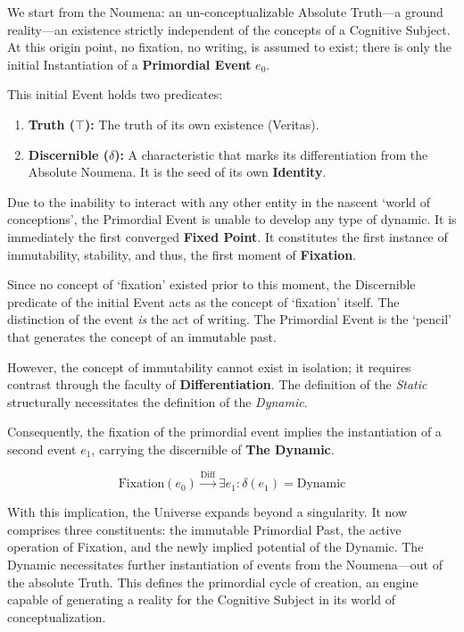 \documentclass[11pt, a4paper]{article}
\theoremstyle{formalism}
\begin{document}
We start from the Noumena: an un-conceptualizable Absolute Truth---a ground
reality---an existence strictly independent of the concepts of a Cognitive
Subject. At this origin point, no fixation, no writing, is assumed to exist;
there is only the initial Instantiation of a \textbf{Primordial Event} $e_0$.

This initial Event holds two predicates:
\begin{enumerate}
    \item \textbf{Truth ($\top$):} The truth of its own existence (Veritas).
    \item \textbf{Discernible ($\delta$):} A characteristic that marks its 
    differentiation from the Absolute Noumena. It is the seed of its own 
    \textbf{Identity}.
\end{enumerate}

Due to the inability to interact with any other entity in the nascent `world of
conceptions', the Primordial Event is unable to develop any type of dynamic. It
is immediately the first converged \textbf{Fixed Point}. It constitutes the
first instance of immutability, stability, and thus, the first moment of
\textbf{Fixation}.

Since no concept of `fixation' existed prior to this moment, the Discernible
predicate of the initial Event acts as the concept of `fixation' itself. The
distinction of the event \textit{is} the act of writing. The Primordial Event
is the `pencil' that generates the concept of an immutable past.

However, the concept of immutability cannot exist in isolation; it requires
contrast through the faculty of \textbf{Differentiation}. The definition of the
\textit{Static} structurally necessitates the definition of the
\textit{Dynamic}.

Consequently, the fixation of the primordial event implies the instantiation of
a second event $e_1$, carrying the discernible of \textbf{The Dynamic}.

\begin{equation}
    \text{Fixation}(e_0) \xrightarrow{\text{Diff}} \exists e_1 : \delta(e_1) = \text{Dynamic}
\end{equation}

With this implication, the Universe expands beyond a singularity. It now
comprises three constituents: the immutable Primordial Past, the active
operation of Fixation, and the newly implied potential of the Dynamic. The
Dynamic necessitates further instantiation of events from the Noumena---out of
the absolute Truth. This defines the primordial cycle of creation, an engine
capable of generating a reality for the Cognitive Subject in its world of
conceptualization.
\end{document}
